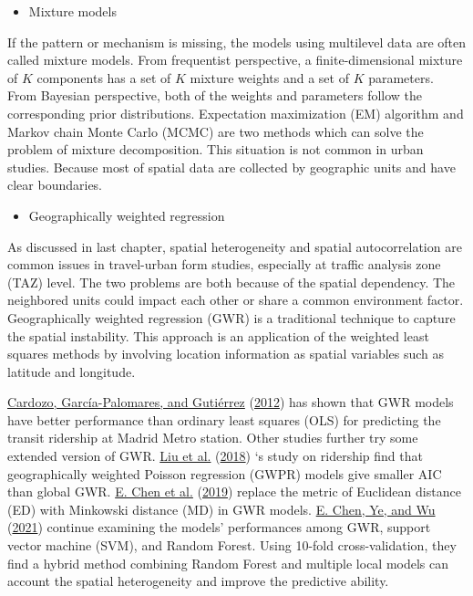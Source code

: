 \documentclass[
  11pt,
  openany]{memoir}
\providecommand{\tightlist}{%
  \setlength{\itemsep}{0pt}\setlength{\parskip}{0pt}}
\begin{document}
\begin{itemize}
\tightlist
\item
  Mixture models
\end{itemize}

If the pattern or mechanism is missing, the models using multilevel data are often called mixture models.
From frequentist perspective, a finite-dimensional mixture of \(K\) components has a set of \(K\) mixture weights and a set of \(K\) parameters.
From Bayesian perspective, both of the weights and parameters follow the corresponding prior distributions.
Expectation maximization (EM) algorithm and Markov chain Monte Carlo (MCMC) are two methods which can solve the problem of mixture decomposition.
This situation is not common in urban studies. Because most of spatial data are collected by geographic units and have clear boundaries.

\begin{itemize}
\tightlist
\item
  Geographically weighted regression
\end{itemize}

As discussed in last chapter, spatial heterogeneity and spatial autocorrelation are common issues in travel-urban form studies, especially at traffic analysis zone (TAZ) level.
The two problems are both because of the spatial dependency. The neighbored units could impact each other or share a common environment factor.
Geographically weighted regression (GWR) is a traditional technique to capture the spatial instability.
This approach is an application of the weighted least squares methods by involving location information as spatial variables such as latitude and longitude.

\protect\hyperlink{ref-cardozoApplicationGeographicallyWeighted2012}{Cardozo, García-Palomares, and Gutiérrez} (\protect\hyperlink{ref-cardozoApplicationGeographicallyWeighted2012}{2012}) has shown that GWR models have better performance than ordinary least squares (OLS) for predicting the transit ridership at Madrid Metro station.
Other studies further try some extended version of GWR.
\protect\hyperlink{ref-liuInfluenceBuiltEnvironment2018}{Liu et al.} (\protect\hyperlink{ref-liuInfluenceBuiltEnvironment2018}{2018}) `s study on ridership find that geographically weighted Poisson regression (GWPR) models give smaller AIC than global GWR.
\protect\hyperlink{ref-chenDiscoveringSpatiotemporalImpacts2019}{E. Chen et al.} (\protect\hyperlink{ref-chenDiscoveringSpatiotemporalImpacts2019}{2019}) replace the metric of Euclidean distance (ED) with Minkowski distance (MD) in GWR models.
\protect\hyperlink{ref-chenNonlinearEffectsBuilt2021}{E. Chen, Ye, and Wu} (\protect\hyperlink{ref-chenNonlinearEffectsBuilt2021}{2021}) continue examining the models' performances among GWR, support vector machine (SVM), and Random Forest. Using 10-fold cross-validation, they find a hybrid method combining Random Forest and multiple local models can account the spatial heterogeneity and improve the predictive ability.
\end{document}

